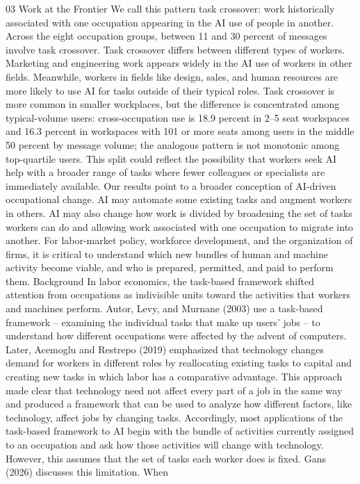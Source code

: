 03
Work at the Frontier
We call this pattern task crossover: work historically associated with one occupation appearing in the AI
use of people in another. Across the eight occupation groups, between 11 and 30 percent of messages
involve task crossover.
Task crossover differs between different types of workers. Marketing and engineering work appears
widely in the AI use of workers in other fields. Meanwhile, workers in fields like design, sales, and human
resources are more likely to use AI for tasks outside of their typical roles. Task crossover is more common
in smaller workplaces, but the difference is concentrated among typical-volume users: cross-occupation
use is 18.9 percent in 2–5 seat workspaces and 16.3 percent in workspaces with 101 or more seats among
users in the middle 50 percent by message volume; the analogous pattern is not monotonic among
top-quartile users. This split could reflect the possibility that workers seek AI help with a broader range of
tasks where fewer colleagues or specialists are immediately available.
Our results point to a broader conception of AI-driven occupational change. AI may automate some
existing tasks and augment workers in others. AI may also change how work is divided by broadening the
set of tasks workers can do and allowing work associated with one occupation to migrate into another.
For labor-market policy, workforce development, and the organization of firms, it is critical to understand
which new bundles of human and machine activity become viable, and who is prepared, permitted, and
paid to perform them.
Background
In labor economics, the task-based framework shifted attention from occupations as indivisible units
toward the activities that workers and machines perform. Autor, Levy, and Murnane (2003) use a
task-based framework – examining the individual tasks that make up users’ jobs – to understand how
different occupations were affected by the advent of computers. Later, Acemoglu and Restrepo (2019)
emphasized that technology changes demand for workers in different roles by reallocating existing tasks
to capital and creating new tasks in which labor has a comparative advantage. This approach made clear
that technology need not affect every part of a job in the same way and produced a framework that can
be used to analyze how different factors, like technology, affect jobs by changing tasks.
Accordingly, most applications of the task-based framework to AI begin with the bundle of activities
currently assigned to an occupation and ask how those activities will change with technology. However,
this assumes that the set of tasks each worker does is fixed. Gans (2026) discusses this limitation. When
